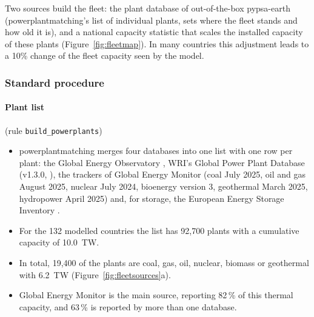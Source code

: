 Two sources build the fleet: the plant database of out-of-the-box pypsa-earth (powerplantmatching's list of individual plants, sets where the fleet stands and how old it is), and a national capacity statistic that scales the installed capacity of these plants (Figure~\ref{fig:fleetmap}).
In many countries this adjustment leads to a 10\% change of the fleet capacity seen by the model.

\subsubsection{Standard procedure}\label{sec:fleet-standard}

\paragraph{Plant list} (rule \texttt{build\_powerplants})
\begin{itemize}[nosep,leftmargin=*]
  \item powerplantmatching \citep{powerplantmatching} merges four databases into one list with one row per plant: the Global Energy Observatory \citep{geo}, WRI's Global Power Plant Database (v1.3.0, \citealp{gppd}), the trackers of Global Energy Monitor \citep{gem} (coal July 2025, oil and gas August 2025, nuclear July 2024, bioenergy version 3, geothermal March 2025, hydropower April 2025) and, for storage, the European Energy Storage Inventory \citep{eesi}.
  \item For the 132 modelled countries the list has 92,700 plants with a cumulative capacity of \SI{10.0}{TW}.
  \item In total, 19,400 of the plants are coal, gas, oil, nuclear, biomass or geothermal with \SI{6.2}{TW} (Figure~\ref{fig:fleetsources}a).
  \item Global Energy Monitor is the main source, reporting 82\,\% of this thermal capacity, and 63\,\% is reported by more than one database.
\end{itemize}

